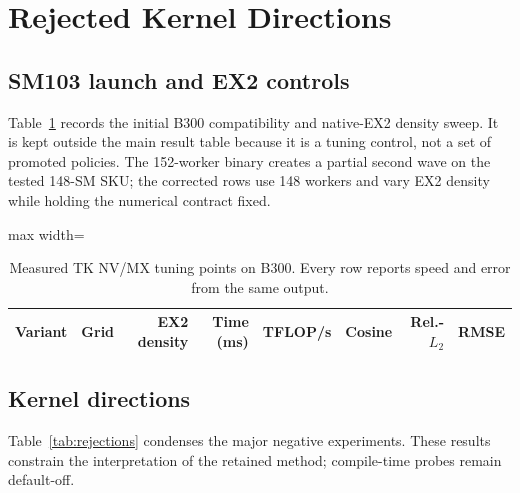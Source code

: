 \section{Rejected Kernel Directions}
\label{app:rejections}

\subsection{SM103 launch and EX2 controls}
\label{app:sm103-tuning}

Table~\ref{tab:b300-tuning} records the initial B300 compatibility and
native-EX2 density sweep. It is kept outside the main result table because it
is a tuning control, not a set of promoted policies. The 152-worker binary
creates a partial second wave on the tested 148-SM SKU; the corrected rows use
148 workers and vary EX2 density while holding the numerical contract fixed.

\begin{table}[htbp]
\centering
\caption{Measured TK NV/MX tuning points on B300. Every row reports speed and
error from the same output.}
\label{tab:b300-tuning}
\scriptsize
\begin{adjustbox}{max width=\textwidth}
\begin{tabular}{lrrrrrrr}
\toprule
Variant & Grid & EX2 density & Time (ms) & TFLOP/s & Cosine & Rel.-$L_2$ & RMSE \\
\midrule
%
\end{tabular}
\end{adjustbox}
\end{table}

\subsection{Kernel directions}

Table~\ref{tab:rejections} condenses the major negative experiments. These
results constrain the interpretation of the retained method; compile-time
probes remain default-off.

